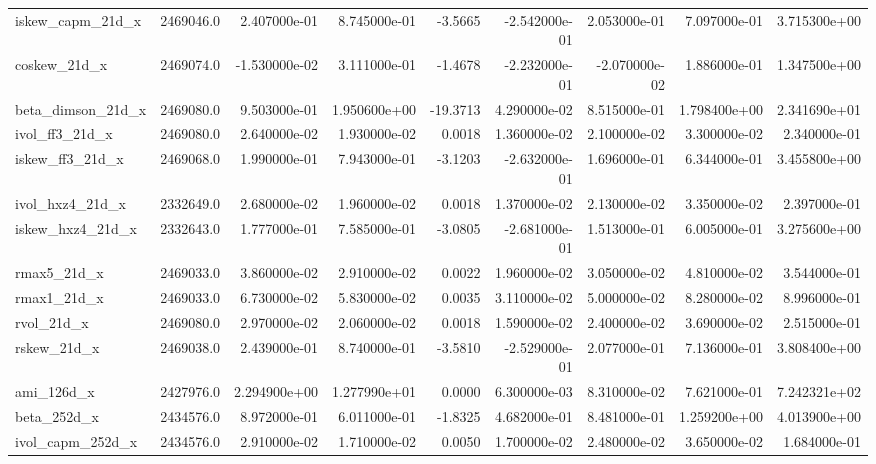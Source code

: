 \documentclass[12pt]{article}
\begin{document}
\begin{landscape}
\begin{longtable}{|l|r|r|r|r|r|r|r|r|}
iskew\_capm\_21d\_x        &  2469046.0 &  2.407000e-01 &  8.745000e-01 &     -3.5665 & -2.542000e-01 &  2.053000e-01 &  7.097000e-01 &  3.715300e+00 \\
coskew\_21d\_x            &  2469074.0 & -1.530000e-02 &  3.111000e-01 &     -1.4678 & -2.232000e-01 & -2.070000e-02 &  1.886000e-01 &  1.347500e+00 \\
beta\_dimson\_21d\_x       &  2469080.0 &  9.503000e-01 &  1.950600e+00 &    -19.3713 &  4.290000e-02 &  8.515000e-01 &  1.798400e+00 &  2.341690e+01 \\
ivol\_ff3\_21d\_x          &  2469080.0 &  2.640000e-02 &  1.930000e-02 &      0.0018 &  1.360000e-02 &  2.100000e-02 &  3.300000e-02 &  2.340000e-01 \\
iskew\_ff3\_21d\_x         &  2469068.0 &  1.990000e-01 &  7.943000e-01 &     -3.1203 & -2.632000e-01 &  1.696000e-01 &  6.344000e-01 &  3.455800e+00 \\
ivol\_hxz4\_21d\_x         &  2332649.0 &  2.680000e-02 &  1.960000e-02 &      0.0018 &  1.370000e-02 &  2.130000e-02 &  3.350000e-02 &  2.397000e-01 \\
iskew\_hxz4\_21d\_x        &  2332643.0 &  1.777000e-01 &  7.585000e-01 &     -3.0805 & -2.681000e-01 &  1.513000e-01 &  6.005000e-01 &  3.275600e+00 \\
rmax5\_21d\_x             &  2469033.0 &  3.860000e-02 &  2.910000e-02 &      0.0022 &  1.960000e-02 &  3.050000e-02 &  4.810000e-02 &  3.544000e-01 \\
rmax1\_21d\_x             &  2469033.0 &  6.730000e-02 &  5.830000e-02 &      0.0035 &  3.110000e-02 &  5.000000e-02 &  8.280000e-02 &  8.996000e-01 \\
rvol\_21d\_x              &  2469080.0 &  2.970000e-02 &  2.060000e-02 &      0.0018 &  1.590000e-02 &  2.400000e-02 &  3.690000e-02 &  2.515000e-01 \\
rskew\_21d\_x             &  2469038.0 &  2.439000e-01 &  8.740000e-01 &     -3.5810 & -2.529000e-01 &  2.077000e-01 &  7.136000e-01 &  3.808400e+00 \\
ami\_126d\_x              &  2427976.0 &  2.294900e+00 &  1.277990e+01 &      0.0000 &  6.300000e-03 &  8.310000e-02 &  7.621000e-01 &  7.242321e+02 \\
beta\_252d\_x             &  2434576.0 &  8.972000e-01 &  6.011000e-01 &     -1.8325 &  4.682000e-01 &  8.481000e-01 &  1.259200e+00 &  4.013900e+00 \\
ivol\_capm\_252d\_x        &  2434576.0 &  2.910000e-02 &  1.710000e-02 &      0.0050 &  1.700000e-02 &  2.480000e-02 &  3.650000e-02 &  1.684000e-01 \\

\end{longtable}
\end{landscape}
\end{document}
